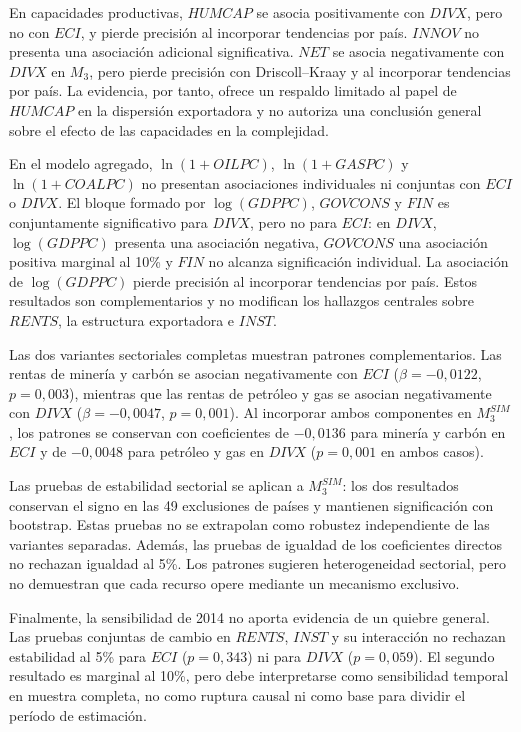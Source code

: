 \documentclass[../../TFM.tex]{subfiles}
\begin{document}
En capacidades productivas, $HUMCAP$ se asocia positivamente con $DIVX$, pero no
con $ECI$, y pierde precisión al incorporar tendencias por país. $INNOV$ no
presenta una asociación adicional significativa. $NET$ se asocia negativamente
con $DIVX$ en $M_3$, pero pierde precisión con Driscoll--Kraay y al incorporar
tendencias por país. La evidencia, por tanto, ofrece un respaldo limitado al
papel de $HUMCAP$ en la dispersión exportadora y no autoriza una conclusión
general sobre el efecto de las capacidades en la complejidad.

En el modelo agregado, $\ln(1+OILPC)$, $\ln(1+GASPC)$ y $\ln(1+COALPC)$ no
presentan asociaciones individuales ni conjuntas con $ECI$ o $DIVX$. El bloque
formado por $\log(GDPPC)$, $GOVCONS$ y $FIN$ es conjuntamente significativo para
$DIVX$, pero no para $ECI$: en $DIVX$, $\log(GDPPC)$ presenta una asociación
negativa, $GOVCONS$ una asociación positiva marginal al 10\% y $FIN$ no alcanza
significación individual. La asociación de $\log(GDPPC)$ pierde precisión al
incorporar tendencias por país. Estos resultados son complementarios y no
modifican los hallazgos centrales sobre $RENTS$, la estructura exportadora e
$INST$.

Las dos variantes sectoriales completas muestran patrones complementarios. Las
rentas de minería y carbón se asocian negativamente con $ECI$
($\beta=-0,0122$, $p=0,003$), mientras que las rentas de petróleo y gas se
asocian negativamente con $DIVX$ ($\beta=-0,0047$, $p=0,001$). Al incorporar
ambos componentes en $M_{3}^{SIM}$, los patrones se conservan con coeficientes
de $-0,0136$ para minería y carbón en $ECI$ y de $-0,0048$ para petróleo y gas
en $DIVX$ ($p=0,001$ en ambos casos).

Las pruebas de estabilidad sectorial se aplican a $M_{3}^{SIM}$: los dos
resultados conservan el signo en las 49 exclusiones de países y mantienen
significación con bootstrap. Estas pruebas no se extrapolan como robustez
independiente de las variantes separadas. Además, las pruebas de igualdad de los
coeficientes directos no rechazan igualdad al 5\%. Los patrones sugieren
heterogeneidad sectorial, pero no demuestran que cada recurso opere mediante un
mecanismo exclusivo.

Finalmente, la sensibilidad de 2014 no aporta evidencia de un quiebre general.
Las pruebas conjuntas de cambio en $RENTS$, $INST$ y su interacción no rechazan
estabilidad al 5\% para $ECI$ ($p=0,343$) ni para $DIVX$ ($p=0,059$). El segundo
resultado es marginal al 10\%, pero debe interpretarse como sensibilidad
temporal en muestra completa, no como ruptura causal ni como base para dividir
el período de estimación.
\end{document}
